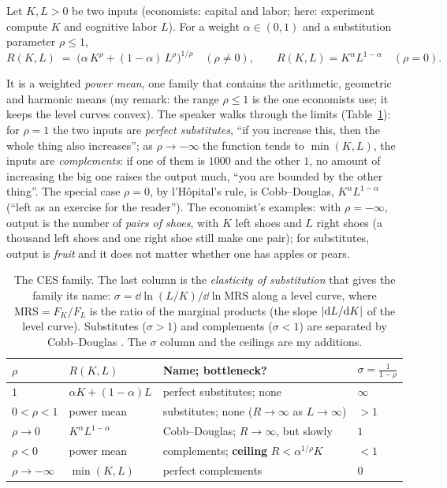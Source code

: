 \begin{defn}\label{def:L4-ces}
Let $K,L>0$ be two inputs (economists: capital and labor; here: experiment compute $K$ and cognitive labor $L$). For a weight $\alpha\in(0,1)$ and a substitution parameter $\rho\le1$,
\[
   R(K,L)\;=\;\big(\alpha\,K^{\rho}+(1-\alpha)\,L^{\rho}\big)^{1/\rho}\quad(\rho\ne0),\qquad R(K,L)=K^{\alpha}L^{1-\alpha}\quad(\rho=0).
\]
\end{defn}
\noindent It is a weighted \emph{power mean}, one family that contains the arithmetic, geometric and harmonic means (my remark: the range $\rho\le1$ is the one economists use; it keeps the level curves convex). The speaker walks through the limits (Table~\ref{tab:L4-ces}): for $\rho=1$ the two inputs are \emph{perfect substitutes}, ``if you increase this, then the whole thing also increases''; as $\rho\to-\infty$ the function tends to $\min(K,L)$, the inputs are \emph{complements}: if one of them is $1000$ and the other $1$, no amount of increasing the big one raises the output much, ``you are bounded by the other thing''. The special case $\rho=0$, by l'H\^opital's rule, is Cobb--Douglas, $K^{\alpha}L^{1-\alpha}$ (``left as an exercise for the reader'').
The economist's examples: with $\rho=-\infty$, output is the number of \emph{pairs of shoes}, with $K$ left shoes and $L$ right shoes (a thousand left shoes and one right shoe still make one pair); for substitutes, output is \emph{fruit} and it does not matter whether one has apples or pears.

\begin{table}[tb]
\centering\small
\renewcommand{\arraystretch}{1.28}
\begin{tabular}{@{}>{\raggedright\arraybackslash}p{17mm}>{\raggedright\arraybackslash}p{34mm}>{\raggedright\arraybackslash}p{44mm}>{\raggedright\arraybackslash}p{16mm}@{}}
\toprule
\textbf{$\rho$} & \textbf{$R(K,L)$} & \textbf{Name; bottleneck?} & \textbf{$\sigma=\frac1{1-\rho}$}\\
\midrule
$1$ & $\alpha K+(1-\alpha)L$ & perfect substitutes; none & $\infty$\\
$0<\rho<1$ & power mean & substitutes; none ($R\to\infty$ as $L\to\infty$) & $>1$\\
$\rho\to0$ & $K^{\alpha}L^{1-\alpha}$ & Cobb--Douglas; $R\to\infty$, but slowly & $1$\\
$\rho<0$ & power mean & complements; \textbf{ceiling} $R<\alpha^{1/\rho}K$ & $<1$\\
$\rho\to-\infty$ & $\min(K,L)$ & perfect complements & $0$\\
\bottomrule
\end{tabular}
\caption{The CES family. The last column is the \emph{elasticity of substitution} that gives the family its name: $\sigma=\dd\ln(L/K)/\dd\ln\mathrm{MRS}$ along a level curve, where $\mathrm{MRS}=F_K/F_L$ is the ratio of the marginal products (the slope $\left\lvert \mathrm{d} L/\mathrm{d} K\right\rvert$ of the level curve). Substitutes ($\sigma>1$) and complements ($\sigma<1$) are separated by Cobb--Douglas \citep{arrow1961}. The $\sigma$ column and the ceilings are my additions\dagmark{}.}
\label{tab:L4-ces}
\end{table}

